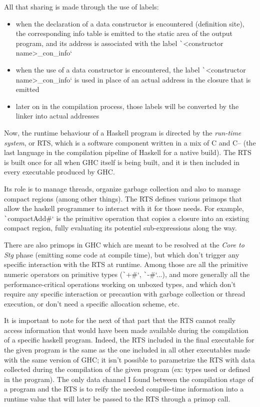\documentclass[english]{jflart}
\begin{document}
All that sharing is made through the use of labels:

\begin{itemize}

\item when the declaration of a data constructor is encountered (definition site), the corresponding info table is emitted to the static area of the output program, and its address is associated with the label \texttt`<constructor name>_con_info`
\item when the use of a data constructor is encountered, the label \texttt`<constructor name>_con_info` is used in place of an actual address in the closure that is emitted
\item later on in the compilation process, those labels will be converted by the linker into actual addresses

\end{itemize}

Now, the runtime behaviour of a Haskell program is directed by the \emph{run-time system}, or RTS, which is a software component written in a mix of C and C-- (the last language in the compilation pipeline of Haskell for a native build). The RTS is built once for all when GHC itself is being built, and it is then included in every executable produced by GHC.

Its role is to manage threads, organize garbage collection and also to manage compact regions (among other things). The RTS defines various primops that allow the haskell programmer to interact with it for those needs. For example, \texttt`compactAdd#` is the primitive operation that copies a closure into an existing compact region, fully evaluating its potentiel sub-expressions along the way.

There are also primops in GHC which are meant to be resolved at the \emph{Core to Stg} phase (emitting some code at compile time), but which don't trigger any specific interaction with the RTS at runtime. Among those are all the primitive numeric operators on primitive types (\texttt`+#`, \texttt`-#`...), and more generally all the performance-critical operations working on unboxed types, and which don't require any specific interaction or precaution with garbage collection or thread execution, or don't need a specific allocation scheme, etc.

It is important to note for the next of that part that the RTS cannot really access information that would have been made available during the compilation of a specific haskell program. Indeed, the RTS included in the final executable for the given program is the same as the one included in all other executables made with the same version of GHC; it isn't possible to parametrize the RTS with data collected during the compilation of the given program (ex: types used or defined in the program). The only data channel I found between the compilation stage of a program and the RTS is to reify the needed compile-time information into a runtime value that will later be passed to the RTS through a primop call.
\end{document}
